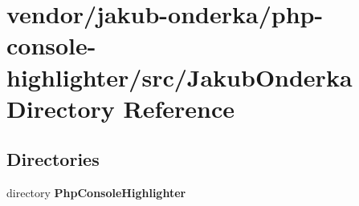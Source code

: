 \section{vendor/jakub-\/onderka/php-\/console-\/highlighter/src/\+Jakub\+Onderka Directory Reference}
\label{dir_a95ececcf19ce90f03d537296a9bd134}
\subsection*{Directories}
\begin{DoxyCompactItemize}
\item 
directory {\bf Php\+Console\+Highlighter}
\end{DoxyCompactItemize}
